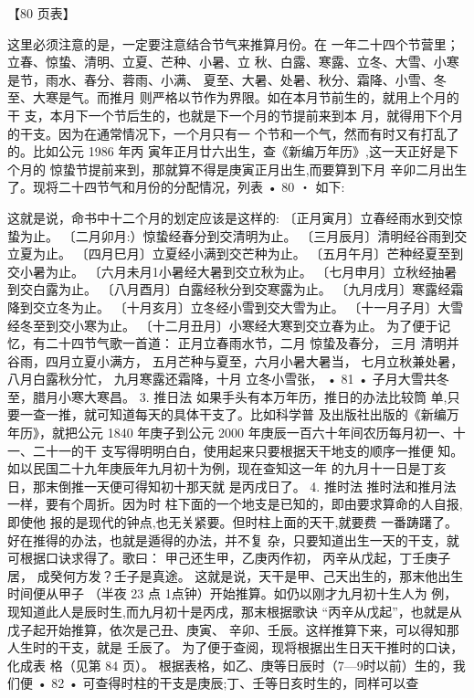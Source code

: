 【80 页表】

这里必须注意的是，一定要注意结合节气来推算月份。在
一年二十四个节营里；立春、惊蛰、清明、立夏、芒种、小暑、立
秋、白露、寒露、立冬、大雪、小寒是节，雨水、春分、蓉雨、小满、
夏至、大暑、处暑、秋分、霜降、小雪、冬至、大寒是气。而推月
则严格以节作为界限。如在本月节前生的，就用上个月的干
支，本月下一个节后生的，也就是下一个月的节提前来到本
月，就得用下个月的干支。因为在通常情况下，一个月只有一
个节和一个气，然而有时又有打乱了的。比如公元 1986 年丙
寅年正月廿六出生，查《新编万年历》,这一天正好是下个月的
惊蛰节提前来到，那就算不得是庚寅正月出生,而要算到下月
辛卯二月出生了。现将二十四节气和月份的分配情况，列表
• 80 ・
如下:

这就是说，命书中十二个月的划定应该是这样的:
〔正月寅月〕立春经雨水到交惊蛰为止。
〔二月卯月:）惊蛰经春分到交清明为止。
〔三月辰月〕清明经谷雨到交立夏为止。
〔四月巳月〕立夏经小满到交芒种为止。
〔五月午月〕芒种经夏至到交小暑为止。
〔六月未月1小暑经大暑到交立秋为止。
〔七月申月〕立秋经抽暑到交白露为止。
〔八月酉月〕白露经秋分到交寒露为止。
〔九月戌月〕寒露经霜降到交立冬为止。
〔十月亥月〕立冬经小雪到交大雪为止。
〔十一月子月〕大雪经冬至到交小寒为止。
〔十二月丑月〕小寒经大寒到交立春为止。
为了便于记忆，有二十四节气歌一首道：
正月立春雨水节，二月 惊蛰及春分，
三月 清明并谷雨，四月立夏小满方，
五月芒种与夏至，六月小暑大暑当，
七月立秋兼处暑，八月白露秋分忙，
九月寒露还霜降，十月 立冬小雪张，
• 81 •
子月大雪共冬至，腊月小寒大寒昌。
3. 推日法 如果手头有本万年历，推日的办法比较筒
单,只要一查一推，就可知道每天的具体干支了。比如科学普
及出版社出版的《新编万年历》，就把公元 1840 年庚子到公元
2000 年庚辰一百六十年间农历每月初一、十一、二十一的干
支写得明明白白，使用起来只要根据天干地支的顺序一推便
知。如以民国二十九年庚辰年九月初十为例，现在查知这一年
的九月十一日是丁亥日，那末倒推一天便可得知初十那天就
是丙戌日了。
4. 推时法 推时法和推月法一样，要有个周折。因为时
柱下面的一个地支是已知的，即由要求算命的人自报,即使他
报的是现代的钟点,也无关紧要。但时柱上面的天干,就要费
一番踌躇了。好在推得的办法，也就是遁得的办法，并不复
杂，只要知道出生一天的干支，就可根据口诀求得了。歌曰：
甲己还生甲，乙庚丙作初，
丙辛从戊起，丁壬庚子居，
成癸何方发？壬子是真途。
这就是说，天干是甲、己天出生的，那末他出生时间便从甲子
（半夜 23 点 1点钟）开始推算。如仍以刚才九月初十生人为
例，现知道此人是辰时生,而九月初十是丙戌，那末根据歌诀
“丙辛从戊起”，也就是从戊子起开始推算，依次是己丑、庚寅、
辛卯、壬辰。这样推算下来，可以得知那人生时的干支，就是
壬辰了。
为了便于查阅，现将根据出生日天干推时的口诀，化成表
格（见第 84 页）。
根据表格，如乙、庚等日辰时（7—9时以前）生的，我们便
• 82 •
可查得时柱的干支是庚辰;丁、壬等日亥时生的，同样可以查
